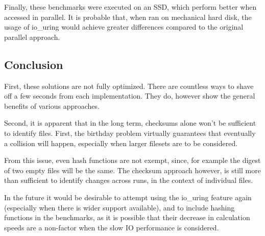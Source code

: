 Finally, these benchmarks were executed on an SSD, which perform better when accessed in parallel.
It is probable that, when ran on mechanical hard disk, the usage of io\_uring would achieve
greater differences compared to the original parallel approach.

\subsection{Conclusion}
First, these solutions are not fully optimized.
There are countless ways to shave off a few seconds from each implementation.
They do, however show the general benefits of various approaches.

Second, it is apparent that in the long term, checksums alone won't be sufficient to identify files.
First, the birthday problem virtually guarantees that eventually a collision will happen,
especially when larger filesets are to be considered.

From this issue, even hash functions are not exempt,
since, for example the digest of two empty files will be the same.
The checksum approach however, is still more than sufficient to identify changes across runs,
in the context of individual files.

In the future it would be desirable to attempt using the io\_uring feature again
(especially when there is wider support available), and to include hashing functions
in the benchmarks, as it is possible that their decrease in calculation speeds are
a non-factor when the slow IO performance is considered.

